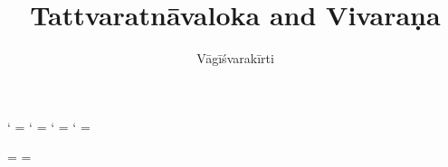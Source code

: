 \documentclass[12pt]{article}
\title{Tattvaratnāvaloka and Vivaraṇa}
\author{Vāgīśvarakīrti}
\begin{document}
\maketitle

\makeatletter
\newXeTeXintercharclass\noextraclass
\XeTeXcharclass `\? = \noextraclass
\XeTeXcharclass `\! = \noextraclass
\XeTeXcharclass `\; = \noextraclass
\XeTeXcharclass `\: = \noextraclass

\AddOpEmph{|}
\AddOpEmph{/}

 \noextraclass = {\nobreak}
\XeTeXinterchartoks {} = {\nobreak}
\makeatother

\newcommand{\PCreading}{$^{pc}$}
\newcommand{\ACreading}{$^{ac}$}
\newcommand{\MS}{K}
\newcommand{\EDD}{E\textsubscript{DH}}
\newcommand{\TM}{TM\textsubscript{D}}
\newcommand{\TVA}{TVA\textsubscript{D}}
\newcommand{\TVB}{TVB\textsubscript{G}}
\newcommand{\TIB}{TIB}
\newcommand{\sigmareading}[1]{$\Sigma$\textsubscript{#1}}

\newcommand{\emd} {\emph{em.}}
\newcommand{\conj} {\emph{conj.}}
\newcommand{\possibleconj} {\emph{possible conj.}}
\newcommand{\corr} {\emph{corr.}}
\newcommand{\diag} {\emph{diag.\ conj.}}
\newcommand{\possibleemd} {\emph{possible em.}}
\end{document}

